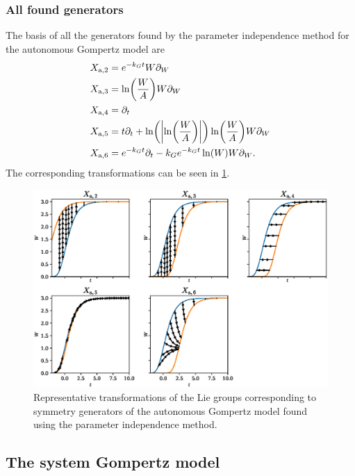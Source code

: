 \subsubsection{All found generators}
The basis of all the generators found by the parameter independence method for the autonomous Gompertz model are
\begin{align*}
  X_{\text{a},2} &= e^{-k_G t} W \partial_W \\
  X_{\text{a},3} &= \ln\left(\frac{W}{A}\right) W \partial_W \\
  X_{\text{a},4} &= \partial_t \\
  X_{\text{a},5} &= t \partial_t + \ln\left(\abs{\ln\left(\frac{W}{A}\right)}\right) \ln\left(\frac{W}{A}\right) W \partial_W \\
  X_{\text{a},6} &= e^{-k_G t} \partial_t - k_G e^{-k_G t} \ln\left(W\right) W \partial_W.
\end{align*}
The corresponding transformations can be seen in \cref{fig:gompertz-autonomous-param}.
\begin{figure}
  \centering
  \includegraphics[width=.96\textwidth]{images/gompertz-autonomous-param}
  \caption{Representative transformations of the Lie groups corresponding to symmetry generators of the autonomous Gompertz model found using the parameter independence method.}
  \label{fig:gompertz-autonomous-param}
\end{figure}

\subsection{The system Gompertz model}

